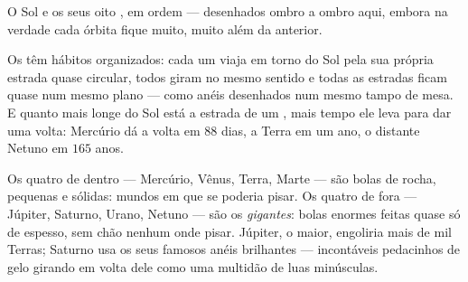 \begin{omfigure}

{\small O Sol e os seus oito , em ordem --- desenhados ombro
a ombro aqui, embora na verdade cada órbita fique muito, muito além
da anterior.}
\end{omfigure}

\begin{proposition}\label{prop:g4:solar-system:habits}
Os  têm hábitos organizados: cada um viaja em torno do Sol
pela sua própria estrada quase circular, todos giram no mesmo
sentido e todas as estradas ficam quase num mesmo plano --- como
anéis desenhados num mesmo tampo de mesa. E quanto mais longe do Sol
está a estrada de um , mais tempo ele leva para dar uma volta:
Mercúrio dá a volta em $88$ dias, a Terra em um ano, o distante
Netuno em $165$ anos.
\end{proposition}

\begin{example}\label{ex:g4:solar-system:kinds}
Os quatro  de dentro --- Mercúrio, Vênus, Terra, Marte ---
são bolas de rocha, pequenas e sólidas: mundos em que se poderia
pisar. Os quatro de fora --- Júpiter, Saturno, Urano, Netuno --- são
os \emph{gigantes}: bolas enormes feitas quase só de  espesso, sem
chão nenhum onde pisar. Júpiter, o maior, engoliria mais de mil
Terras; Saturno usa os seus famosos anéis brilhantes --- incontáveis
pedacinhos de gelo girando em volta dele como uma multidão de luas
minúsculas.
\end{example}

